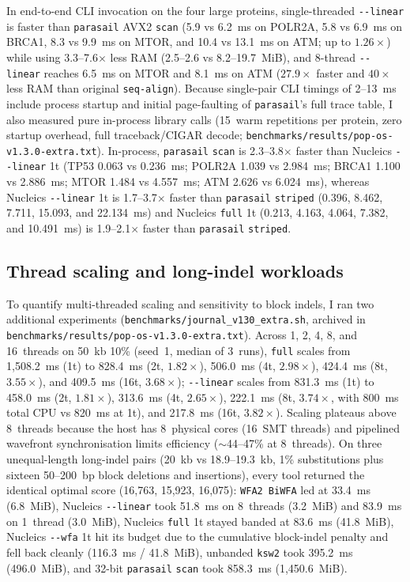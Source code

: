 \documentclass[11pt,a4paper]{article}
\begin{document}
In end-to-end CLI invocation on the four large proteins, single-threaded \texttt{-{}-linear} is faster than \texttt{parasail} AVX2 \texttt{scan} (5.9 vs 6.2~ms on POLR2A, 5.8 vs 6.9~ms on BRCA1, 8.3 vs 9.9~ms on MTOR, and 10.4 vs 13.1~ms on ATM; up to $1.26\times$) while using 3.3--7.6$\times$ less RAM (2.5--2.6 vs 8.2--19.7~MiB), and 8-thread \texttt{-{}-linear} reaches 6.5~ms on MTOR and 8.1~ms on ATM ($27.9\times$ faster and $40\times$ less RAM than original \texttt{seq-align}). Because single-pair CLI timings of 2--13~ms include process startup and initial page-faulting of \texttt{parasail}'s full trace table, I also measured pure in-process library calls (15~warm repetitions per protein, zero startup overhead, full traceback/CIGAR decode; \texttt{benchmarks/results/pop-os-v1.3.0-extra.txt}). In-process, \texttt{parasail} \texttt{scan} is 2.3--3.8$\times$ faster than Nucleics \texttt{-{}-linear} 1t (TP53 0.063 vs 0.236~ms; POLR2A 1.039 vs 2.984~ms; BRCA1 1.100 vs 2.886~ms; MTOR 1.484 vs 4.557~ms; ATM 2.626 vs 6.024~ms), whereas Nucleics \texttt{-{}-linear} 1t is 1.7--3.7$\times$ faster than \texttt{parasail} \texttt{striped} (0.396, 8.462, 7.711, 15.093, and 22.134~ms) and Nucleics \texttt{full} 1t (0.213, 4.163, 4.064, 7.382, and 10.491~ms) is 1.9--2.1$\times$ faster than \texttt{parasail} \texttt{striped}.

\subsection{Thread scaling and long-indel workloads}
\label{sec:scaling_extra}

To quantify multi-threaded scaling and sensitivity to block indels, I ran two additional experiments (\texttt{benchmarks/journal\_v130\_extra.sh}, archived in \texttt{benchmarks/results/pop-os-v1.3.0-extra.txt}). Across 1, 2, 4, 8, and 16~threads on 50~kb 10\% (seed~1, median of 3~runs), \texttt{full} scales from 1,508.2~ms (1t) to 828.4~ms (2t, $1.82\times$), 506.0~ms (4t, $2.98\times$), 424.4~ms (8t, $3.55\times$), and 409.5~ms (16t, $3.68\times$); \texttt{-{}-linear} scales from 831.3~ms (1t) to 458.0~ms (2t, $1.81\times$), 313.6~ms (4t, $2.65\times$), 222.1~ms (8t, $3.74\times$, with 800~ms total CPU vs 820~ms at 1t), and 217.8~ms (16t, $3.82\times$). Scaling plateaus above 8~threads because the host has 8~physical cores (16~SMT threads) and pipelined wavefront synchronisation limits efficiency ($\sim$44--47\% at 8~threads). On three unequal-length long-indel pairs (20~kb vs 18.9--19.3~kb, 1\% substitutions plus sixteen 50--200~bp block deletions and insertions), every tool returned the identical optimal score (16,763, 15,923, 16,075): \texttt{WFA2 BiWFA} led at 33.4~ms (6.8~MiB), Nucleics \texttt{-{}-linear} took 51.8~ms on 8~threads (3.2~MiB) and 83.9~ms on 1~thread (3.0~MiB), Nucleics \texttt{full} 1t stayed banded at 83.6~ms (41.8~MiB), Nucleics \texttt{-{}-wfa} 1t hit its budget due to the cumulative block-indel penalty and fell back cleanly (116.3~ms / 41.8~MiB), unbanded \texttt{ksw2} took 395.2~ms (496.0~MiB), and 32-bit \texttt{parasail} \texttt{scan} took 858.3~ms (1,450.6~MiB).
\end{document}
